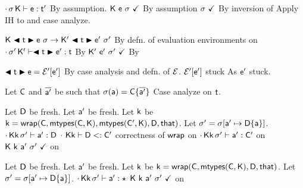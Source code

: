 \documentclass[acmlarge, anonymous, authordraft]{acmart}
\begin{document}
\begin{proofy}
\stepp[base] $\EnvType\cdot\s\K\e\tp$ \basis By assumption.
\stepp[progform] ${\sf{K}}~{\sf{e}}~\sigma~\checkmark$ \basis By assumption
\stepp[inpswf] $\sigma~\checkmark$ \basis By inversion of 
\stepp Apply IH to  and case analyze.
\begin{casel}
  \caseof{ \begin{iknown}
    \stepp[kred] $\Reduce\K\e\s\Kp\ep\sp$
    \stepp[kbase] $\WFp\Kp{\ep~\sp}$
    \stepp $\EnvType\cdot\sp\Kp\ep\tp$
    \end{iknown}} 
  \begin{proofy}
  \stepp $\Reduce\K{\BehCast{\t}{\e}}\s\Kp{\BehCast{\t}{\ep}}\sp$ \basis By defn. of evaluation environments on 
  \stepp[ktype] $\EnvType\cdot\sp\Kp{\BehCast\t\ep}\t$ \basis By 
  \stepp $\WFp\Kp{\ep~\sp}$ \basis By 
  \end{proofy}
  \begin{proofy}
    \stepp $\BehCast\t\e = \EE'[\ep]$ \basis By case analysis and defn. of $\mathcal{E}$.
    \stepp $\mathcal{E}'[{{{\sf{e'}}}}]$ stuck \basis As ${{{\sf{e'}}}}$ stuck.
  \end{proofy}
  \caseof{$\e = \a$}
  \begin{proofy}
    \stepp Let ${\sf{C}}$ and $\overline{{\sf{a}}'}$ be such that $\sigma({\sf{a}}) = {\sf{C}}\{\overline{{\sf{a}}'}\}$
    \stepp Case analyze on $\t$.
    \begin{casel}
      \caseof{$\t = \Cp$}
      \begin{proofy}
        \stepp Let ${\sf{D}}$ be fresh.
        \stepp Let ${\sf{a}}'$ be fresh.
        \stepp[wcorr] Let ${\sf{k}}$ be ${\sf{k}} = {\sf{wrap}}({\sf{C}},{\sf{mtypes}}({\sf{C}},{\sf{K}}),{\sf{mtypes}}({\sf{C'}},{\sf{K}}),{\sf{D}},{\sf{that}})$.
        \stepp Let ${{\sigma'}} = \sigma[{\sf{a}}' \mapsto {\sf{D}}\{{\sf{a}}\}]$.
        \stepp[b2] $\cdot\,{\sf{K}}{\sf{k}}\,{{\sigma'}}\vdash {\sf{a}}' : {\sf{D}}$ \basis {}
        \stepp[b1] $\cdot~{\sf{K}}{\sf{k}}\vdash {\sf{D}}<: {\sf{C'}}$ \basis correctness of ${\sf{wrap}}$ on 
        \stepp[wth] $\cdot\,{\sf{K}}{\sf{k}}\,{{\sigma'}}\vdash {\sf{a}}' : {\sf{C'}}$ \basis {} on 
        \stepp ${\sf{K}} ~ {\sf{k}}~{\sf{a}}'~{{\sigma'}}~\checkmark$ \basis {} on 
      \end{proofy}
      \caseof{$\t = \any$}
      \begin{proofy}
        \stepp Let ${\sf{D}}$ be fresh.
        \stepp Let ${\sf{a}}'$ be fresh.
        \stepp[wcorr2] Let ${\sf{k}}$ be ${\sf{k}} = {\sf{wrap}}({\sf{C}},{\sf{mtypes}}({\sf{C}},{\sf{K}}),{\sf{D}},{\sf{that}})$.
        \stepp Let ${{\sigma'}} = \sigma[{\sf{a}}' \mapsto {\sf{D}}\{{\sf{a}}\}]$.
        \stepp[b21] $\cdot\,{\sf{K}}{\sf{k}}\,{{\sigma'}}\vdash {\sf{a}}' : \star$ \basis {}
        \stepp ${\sf{K}} ~ {\sf{k}}~{\sf{a}}'~{{\sigma'}}~\checkmark$ \basis {} on 
      \end{proofy}
    \end{casel}
  \end{proofy}
\end{casel}
\end{proofy}
\end{document}
